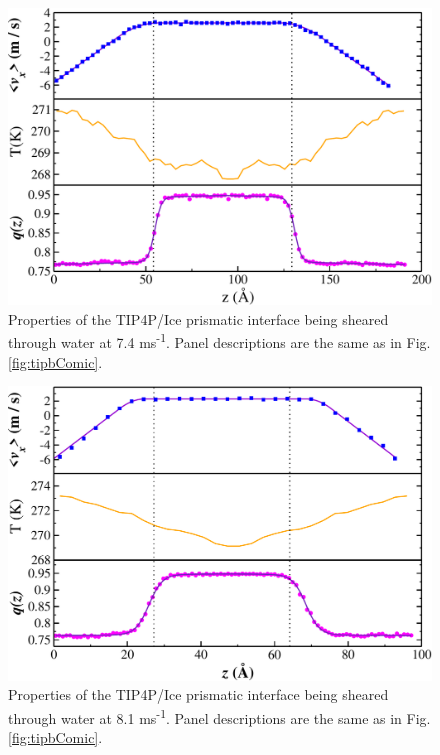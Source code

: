 \begin{figure}
\includegraphics[width=\linewidth]{Figures/Prism_TIP4PIce_Plot}
\caption{\label{fig:tippComic} Properties of the TIP4P/Ice prismatic
  interface being sheared through water at 7.4 ms\textsuperscript{-1}.
  Panel descriptions are the same as in Fig. \ref{fig:tipbComic}.}
\end{figure}

\begin{figure}
\includegraphics[width=\linewidth]{Figures/Pyra_TIP4PIce_Plot}
\caption{\label{fig:tippyComic} Properties of the TIP4P/Ice prismatic
  interface being sheared through water at 8.1 ms\textsuperscript{-1}.
  Panel descriptions are the same as in Fig. \ref{fig:tipbComic}.}
\end{figure}

